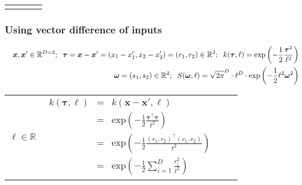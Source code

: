 \documentclass[onecolumn,a4paper,11pt]{article}
\begin{document}
\begin{landscape}
\begin{table}[H]
\begin{center}
\begin{tabular}{|c|c|c|c|}
       & \multicolumn{1}{|p{5.2cm}|}{

       } \\          
       \hline\\   
    \end{tabular}
  \end{center}
\end{table}


\newpage	
\subsubsection{Using vector difference of inputs}
\vspace{-5mm}

\begin{table}[H]
\small
\begin{eqnarray*}
\vspace{-10mm}
&&\bm{x}, \bm{x}' \in \mathbb{R}^{D=2}; \hspace{2mm}\bm{\tau} =\bm{x}-\bm{x}' = (x_1-x_1',x_2-x_2') = (r_1,r_2) \in \mathbb{R}^2; \hspace{2mm} k(\bm{\tau},\ell) = \mathrm{exp}\left(-\frac{1}{2} \frac{\bm{\tau}^2}{\ell^2} \right)\\
&& \bm{\omega}= (s_1,s_2) \in \mathbb{R}^2; \hspace{2mm} S(\bm{\omega},\ell) = \sqrt{2\pi}^D \cdot \ell^D \cdot \mathrm{exp}\left(-\frac{1}{2} \ell^2 \bm{\omega}^2 \right)
\end{eqnarray*}
\normalsize
  \begin{center}
    \begin{tabular}{|c|c|c|c|}
    
       \hline
       \multicolumn{1}{|p{1.5cm}|}{
       \vspace{1mm}
       $\ell \in \mathbb{R}$
       }
       
        & \multicolumn{1}{|p{7.2cm}|}{
         \begin{eqnarray*}
		k(\bm{\tau},\ell) &=& k(\bm{x}-\bm{x}',\ell)\\
		&=& \mathrm{exp}\left(-\frac{1}{2} \frac{\bm{\tau}^\top \bm{\tau}}{\ell^2} \right)\\
		&=& \mathrm{exp}\left(-\frac{1}{2} \frac{(r_1, r_2)^\top (r_1, r_2)}{\ell^2} \right)\\
		&=& \mathrm{exp}\left(-\frac{1}{2} \sum_{i=1}^{D}\frac{r_i^2}{\ell^2} \right)
         \end{eqnarray*}
       }
       

\end{tabular}
\end{center}
\end{table}
\end{landscape}
\end{document}
